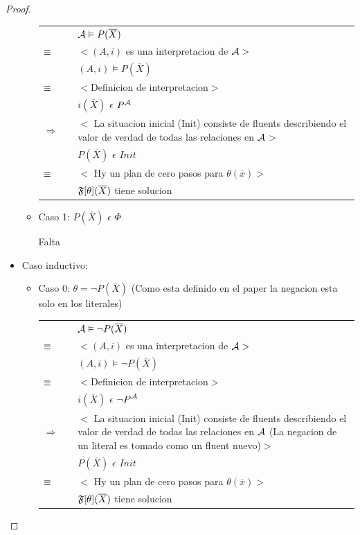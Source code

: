 \begin{proof}
\begin{itemize}
\begin{itemize}
				\begin{tabular}{@{}p{1mm}p{1mm}p{11cm}}	
						& & $\mathcal{A} \vDash P(\overline{X})$\\
						$\equiv$ & & $<(A,i)$ es una interpretacion de $\mathcal{A}>$ \\
						& & $(A,i) \models P(\overline{X})$ \\
						$\equiv$ & & $<$Definicion de interpretacion$>$\\
						& & $i(\overline{X})$ $\epsilon$ $P^{\mathcal{A}}$\\
						$\Rightarrow$ & & $<$ La situacion inicial (Init) consiste de fluents describiendo el valor de 
									  verdad de todas las relaciones en $\mathcal{A}$$>$\\
						& & $P(\overline{X})$ $\epsilon$ $Init$ \\
						$\equiv$ & & $<$ Hy un plan de cero pasos para $\theta(\overline{x})>$\\
						& & $\mathfrak{F}[\theta](\overline{X})$ tiene solucion
					\end{tabular}
					
					
				\item Caso 1: $P(\overline{X})$ $\epsilon$ $\Phi$
				
					  Falta
			\end{itemize}
			
		\item Caso inductivo:
			\begin{itemize}
				\item Caso 0: $\theta = \neg P(\overline{X})$ (Como esta definido en el paper la negacion esta solo en los literales)
				
				\begin{tabular}{@{}p{1mm}p{1mm}p{11cm}}	
						& & $\mathcal{A} \vDash \neg P(\overline{X})$\\
						$\equiv$ & & $<(A,i)$ es una interpretacion de $\mathcal{A}>$ \\
						& & $(A,i) \models \neg P(\overline{X})$ \\
						$\equiv$ & & $<$Definicion de interpretacion$>$\\
						& & $i(\overline{X})$ $\epsilon$ ${\neg P}^{\mathcal{A}}$\\
						$\Rightarrow$ & & $<$ La situacion inicial (Init) consiste de fluents describiendo el valor de 
									  verdad de todas las relaciones en $\mathcal{A}$ (La negacion de un literal es tomado como
									  un fluent nuevo)$>$\\
						& & $P(\overline{X})$ $\epsilon$ $Init$ \\ 
						$\equiv$ & & $<$ Hy un plan de cero pasos para $\theta(\overline{x})>$\\
						& & $\mathfrak{F}[\theta](\overline{X})$ tiene solucion
				\end{tabular}
					

\end{itemize}
\end{itemize}
\end{proof}
